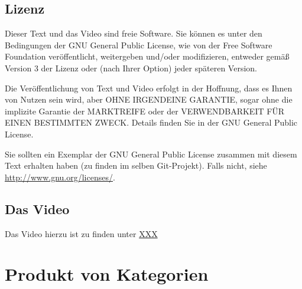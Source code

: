 \documentclass[a4paper]{amsart}
\theoremstyle{definition}
\begin{document}
\subsection*{Lizenz}
Dieser Text und das Video sind freie Software. Sie können es unter den Bedingungen der
GNU General Public License, wie von der Free Software Foundation veröffentlicht, weitergeben
und/oder modifizieren, entweder gemäß Version 3 der Lizenz oder (nach Ihrer Option) jeder späteren Version.

Die Veröffentlichung von Text und Video erfolgt in der Hoffnung, dass es Ihnen von Nutzen sein wird,
aber OHNE IRGENDEINE GARANTIE, sogar ohne die implizite Garantie der MARKTREIFE oder der
VERWENDBARKEIT FÜR EINEN BESTIMMTEN ZWECK. Details finden Sie in der GNU General Public License.

Sie sollten ein Exemplar der GNU General Public License zusammen mit diesem Text erhalten haben
(zu finden im selben Git-Projekt).
Falls nicht, siehe \url{http://www.gnu.org/licenses/}.

\subsection*{Das Video}
Das Video hierzu ist zu finden unter
{\tiny
   \url{XXX}
}

\section{Produkt von Kategorien}

\end{document}
